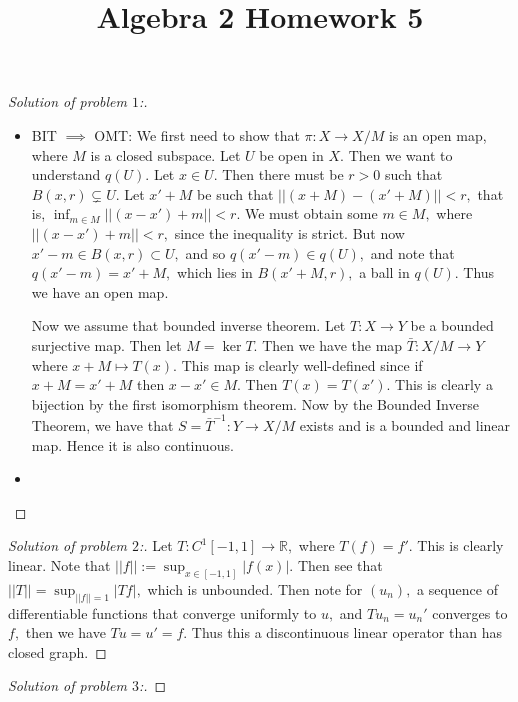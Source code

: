 \documentclass[letterpaper,11pt,twoside]{article}
\title{Algebra 2 Homework 5}
\theoremstyle{proposition}
\theoremstyle{definition}
\theoremstyle{theorem}
\theoremstyle{definition}
\theoremstyle{definition}
\theoremstyle{definition}
\theoremstyle{lemma}
\theoremstyle{definition}
\theoremstyle{definition}
\theoremstyle{corollary}
\theoremstyle{definition}
\theoremstyle{definition}
\theoremstyle{definition}
\newcommand{\norm}[1]{\left \vert \left \vert #1 \right \vert \right \vert}
\begin{document}
	\maketitle
	\begin{proof}[Solution of problem $1$:]
		\begin{itemize}
			\item BIT $\implies$ OMT: We first need to show that $\pi: X \to X/M$ is an open map, where $M$ is a closed subspace. Let $U$ be open in $X.$ 
			Then we want to understand $q(U).$ Let $x \in U.$ Then there must be $r >0$ such that $B(x,r) \subsetneq U.$ Let $x'+M$ be such that 
			$\norm{(x+M)-(x'+M)} <r,$ that is, $\inf_{m \in M} \norm{(x-x')+m} <r.$ We must obtain some $m \in M,$ where $ \norm{(x-x')+m} <r,$ since the 
			inequality is strict. But now $x'-m \in B(x,r) \subset U,$ and so $q(x'-m) \in q(U),$ and note that $q(x'-m)=x'+M,$ which lies in $B(x'+M,r),$ a 
			ball in $q(U).$ Thus we have an open map.
			
			Now we assume that bounded inverse theorem. Let $T:X \to Y$ be a bounded surjective map. Then let $M=\ker T.$ Then we have the map $\bar{T}: X/M 
			\to Y$ where $x+M \mapsto T(x).$  This map is clearly well-defined since if $x+M=x'+M$ then $x-x' \in M.$ Then $T(x)=T(x').$ This is clearly a 
			bijection by the first isomorphism theorem.  Now by the Bounded Inverse Theorem, we have that $S= \bar{T}^{-1}: Y \to X/M$ exists and is a 
			bounded and linear map. Hence it is also continuous. 
			\item 
		\end{itemize}
	\end{proof}
\begin{proof}[Solution of problem $2$:]
	Let $T: C^1[-1,1] \to \mathbb{R},$ where $T(f)=f'.$ This is clearly linear. Note that $\norm{f}:= \sup_{x \in [-1,1]} |f(x)|.$ Then see that $\norm{T}= 
	\sup_{\norm{f}=1}|Tf|,$ which is unbounded. Then note for $(u_n),$ a sequence of differentiable functions that converge uniformly to $u,$ and 
	$Tu_n=u_n'$ converges to $f,$ then we have $Tu=u'=f.$ Thus this a discontinuous linear operator than has closed graph.   
\end{proof}
\begin{proof}[Solution of problem $3$:]
	
\end{proof}
\end{document}
